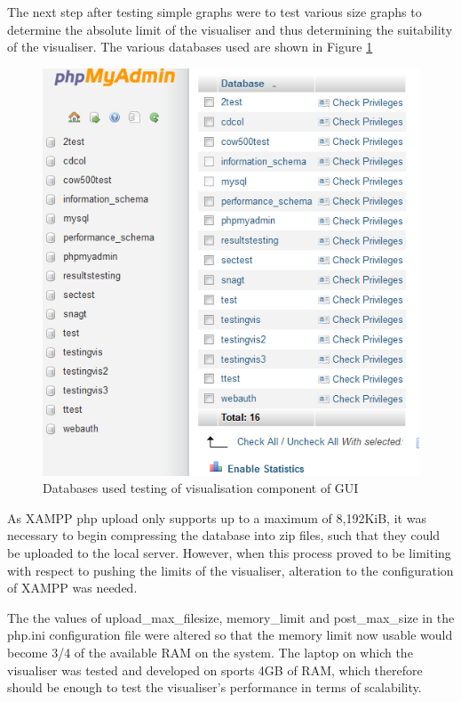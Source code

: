 The next step after testing simple graphs were to test various size graphs to determine the absolute limit of the visualiser and thus determining the suitability of the visualiser. The various databases used are shown in Figure \ref{fig:phpmyadmin}

\begin{figure}[htbp]%
\includegraphics[width=\columnwidth]{./img/phpmyadmin}%
\caption{Databases used testing of visualisation component of GUI}%
\label{fig:phpmyadmin}%
\end{figure}

As XAMPP php upload only supports up to a maximum of 8,192KiB, it was necessary to begin compressing the database into zip files, such that they could be uploaded to the local server. However, when this process proved to be limiting with respect to pushing the limits of the visualiser, alteration to the configuration of XAMPP was needed. 

The the values of upload\_max\_filesize, memory\_limit and post\_max\_size in the php.ini configuration file were altered so that the memory limit now usable would become 3/4 of the available RAM on the system. The laptop on which the visualiser was tested and developed on sports 4GB of RAM, which therefore should be enough to test the visualiser's performance in terms of scalability. 

